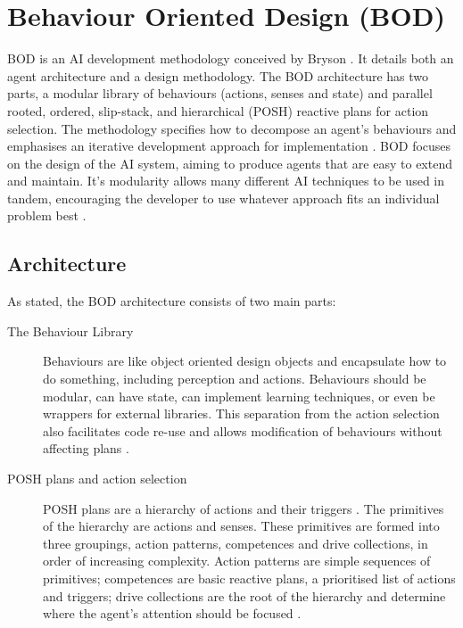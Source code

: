 \documentclass[11pt,openright,a4paper]{report}
\begin{document}
\section{Behaviour Oriented Design (BOD)}
\label{BOD}
BOD is an AI development methodology conceived by Bryson \cite{bryson2001intelligence}. It details both an agent architecture and a design methodology.  The BOD architecture has two parts, a modular library of behaviours (actions, senses and state) and parallel rooted, ordered, slip-stack,  and hierarchical (POSH) reactive plans for action selection. The methodology specifies how to decompose an agent's behaviours and emphasises an iterative development approach for implementation \cite{bryson2003behavior}. BOD focuses on the design of the AI system, aiming to produce agents that are easy to extend and maintain. It's modularity allows many different AI techniques to be used in tandem, encouraging the developer to use whatever approach fits an individual problem best \cite{gaudlbehaviour}.

\subsection{Architecture}
As stated,  the BOD architecture consists of two main parts:
\begin{description}
\item[The Behaviour Library] Behaviours are like object oriented design objects and encapsulate how to do something, including perception and actions. Behaviours should be modular, can have state, can implement learning techniques, or even be wrappers for external libraries. This separation from the action selection also facilitates code re-use and allows modification of behaviours without affecting plans \cite{gaudlbehaviour}.
\item[POSH plans and action selection] \label{POSHPlans}POSH plans are a hierarchy of actions and their triggers \cite{gaudlbehaviour}. The primitives of the hierarchy are actions and senses. These primitives are formed into three groupings, action patterns, competences and drive collections, in order of increasing complexity. Action patterns are simple sequences of primitives; competences are basic reactive plans, a prioritised list of actions and triggers; drive collections are the root of the hierarchy and determine where the agent's attention should be focused \cite{bryson2003behavior}.
\end{description}
\end{document}
